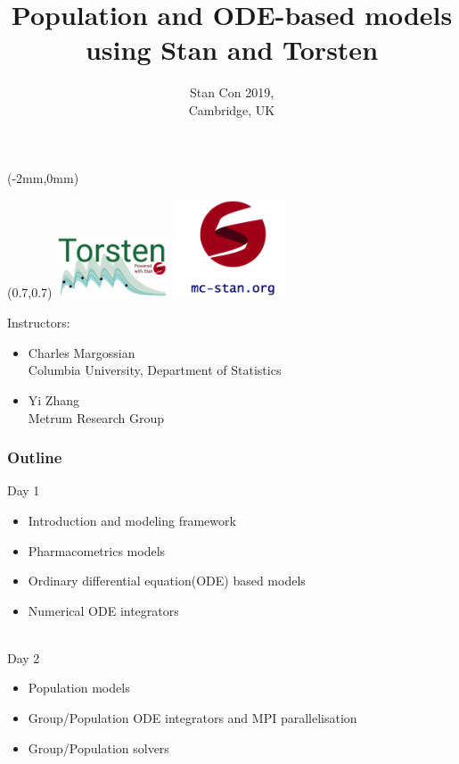 \documentclass[xcolor=table]{beamer}
\title[Stan workshop 2019]{\textcolor{MRGGreen}{Population and ODE-based models \\
 using Stan and Torsten}}
\date{Stan Con 2019, \\ Cambridge, UK}
\begin{document}
 

\begin{frame}
  \begin{textblock*}{80mm}(-2mm,0mm)
  \end{textblock*}
  \begin{textblock*}{80mm}(0.7\textwidth,0.7\textheight)
    \includegraphics[width=0.25\textwidth]{../torstenLogo.png}
    \includegraphics[width=0.25\textwidth]{../stanLogo.png}
  \end{textblock*}
  \titlepage
\end{frame}

\begin{frame}
  Instructors:
  \begin{itemize}
    \item {Charles Margossian \\ Columbia University, Department of Statistics}
    \item {Yi Zhang \\ Metrum Research Group}
  \end{itemize}
  
\end{frame}

\begin{frame}
  \frametitle{Outline}

   Day 1
   \begin{itemize}
     \item Introduction and modeling framework
     \item Pharmacometrics models
     \item Ordinary differential equation(ODE) based models
     \item Numerical ODE integrators
   \end{itemize}
   
   \ \\
   Day 2
   \begin{itemize}
     \item Population models
     \item Group/Population ODE integrators and MPI parallelisation
     \item Group/Population solvers
   \end{itemize}
\end{frame}
\end{document}
